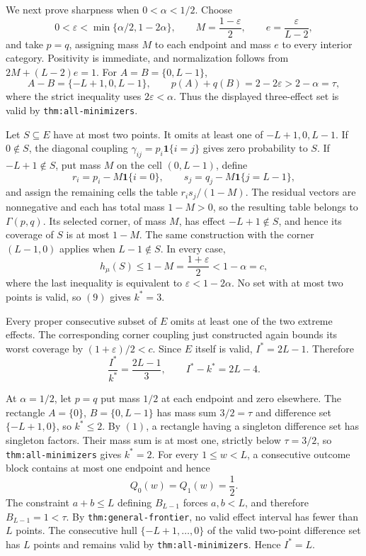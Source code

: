 We next prove sharpness when \(0<\alpha<1/2\).  Choose
\[
0<\varepsilon<\min\{\alpha/2,1-2\alpha\},
\qquad
M=\frac{1-\varepsilon}{2},
\qquad
e=\frac{\varepsilon}{L-2},
\]
and take \(p=q\), assigning mass \(M\) to each endpoint and mass \(e\) to every interior category.  Positivity is immediate, and normalization follows from \(2M+(L-2)e=1\).  For \(A=B=\{0,L-1\}\),
\[
A-B=\{-L+1,0,L-1\},
\qquad
p(A)+q(B)=2-2\varepsilon>2-\alpha=\tau,
\tag{9}
\]
where the strict inequality uses \(2\varepsilon<\alpha\).  Thus the displayed three-effect set is valid by \texttt{thm:all-minimizers}.

Let \(S\subseteq E\) have at most two points.  It omits at least one of \(-L+1,0,L-1\).  If \(0\notin S\), the diagonal coupling \(\gamma_{ij}=p_i\mathbf 1\{i=j\}\) gives zero probability to \(S\).  If \(-L+1\notin S\), put mass \(M\) on the cell \((0,L-1)\), define
\[
r_i=p_i-M\mathbf 1\{i=0\},
\qquad
s_j=q_j-M\mathbf 1\{j=L-1\},
\]
and assign the remaining cells the table \(r_is_j/(1-M)\).  The residual vectors are nonnegative and each has total mass \(1-M>0\), so the resulting table belongs to \(\Gamma(p,q)\).  Its selected corner, of mass \(M\), has effect \(-L+1\notin S\), and hence its coverage of \(S\) is at most \(1-M\).  The same construction with the corner \((L-1,0)\) applies when \(L-1\notin S\).  In every case,
\[
h_{\mu}(S)\leq1-M=\frac{1+\varepsilon}{2}<1-\alpha=c,
\tag{10}
\]
where the last inequality is equivalent to \(\varepsilon<1-2\alpha\).  No set with at most two points is valid, so \((9)\) gives \(k^*=3\).

Every proper consecutive subset of \(E\) omits at least one of the two extreme effects.  The corresponding corner coupling just constructed again bounds its worst coverage by \((1+\varepsilon)/2<c\).  Since \(E\) itself is valid, \(I^*=2L-1\).  Therefore
\[
\frac{I^*}{k^*}=\frac{2L-1}{3},
\qquad
I^*-k^*=2L-4.
\tag{11}
\]

At \(\alpha=1/2\), let \(p=q\) put mass \(1/2\) at each endpoint and zero elsewhere.  The rectangle \(A=\{0\}\), \(B=\{0,L-1\}\) has mass sum \(3/2=\tau\) and difference set \(\{-L+1,0\}\), so \(k^*\leq2\).  By \((1)\), a rectangle having a singleton difference set has singleton factors.  Their mass sum is at most one, strictly below \(\tau=3/2\), so \texttt{thm:all-minimizers} gives \(k^*=2\).  For every \(1\leq w<L\), a consecutive outcome block contains at most one endpoint and hence
\[
Q_0(w)=Q_1(w)=\frac12.
\]
The constraint \(a+b\leq L\) defining \(B_{L-1}\) forces \(a,b<L\), and therefore \(B_{L-1}=1<\tau\).  By \texttt{thm:general-frontier}, no valid effect interval has fewer than \(L\) points.  The consecutive hull \(\{-L+1,\ldots,0\}\) of the valid two-point difference set has \(L\) points and remains valid by \texttt{thm:all-minimizers}.  Hence \(I^*=L\).

